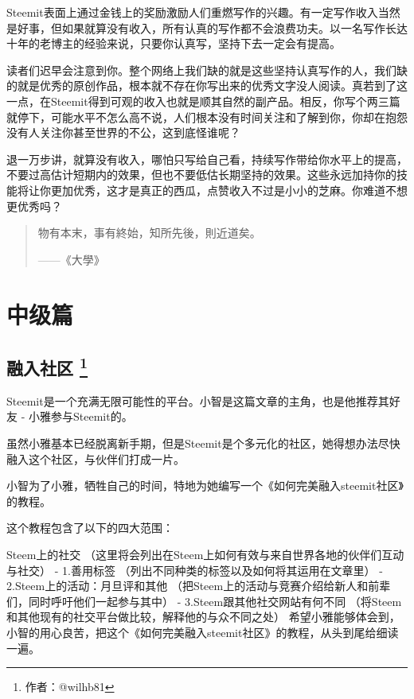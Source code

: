 \documentclass[]{ctexbook}
\begin{document}
Steemit表面上通过金钱上的奖励激励人们重燃写作的兴趣。有一定写作收入当然是好事，但如果就算没有收入，所有认真的写作都不会浪费功夫。以一名写作长达十年的老博主的经验来说，只要你认真写，坚持下去一定会有提高。

读者们迟早会注意到你。整个网络上我们缺的就是这些坚持认真写作的人，我们缺的就是优秀的原创作品，根本就不存在你写出来的优秀文字没人阅读。真若到了这一点，在Steemit得到可观的收入也就是顺其自然的副产品。相反，你写个两三篇就停下，可能水平不怎么高不说，人们根本没有时间关注和了解到你，你却在抱怨没有人关注你甚至世界的不公，这到底怪谁呢？

退一万步讲，就算没有收入，哪怕只写给自己看，持续写作带给你水平上的提高，不要过高估计短期内的效果，但也不要低估长期坚持的效果。这些永远加持你的技能将让你更加优秀，这才是真正的西瓜，点赞收入不过是小小的芝麻。你难道不想更优秀吗？

\begin{quote}
物有本末，事有終始，知所先後，則近道矣。

\begin{flushright}------《大學》\end{flushright}
\end{quote}

\hypertarget{zjp}{%
\part{中级篇}\label{zjp}}

\chapter[融入社区 ]{\texorpdfstring{融入社区 \footnote{作者：@wilhb81}}{融入社区 }}

Steemit是一个充满无限可能性的平台。小智是这篇文章的主角，也是他推荐其好友 - 小雅参与Steemit的。

虽然小雅基本已经脱离新手期，但是Steemit是个多元化的社区，她得想办法尽快融入这个社区，与伙伴们打成一片。

小智为了小雅，牺牲自己的时间，特地为她编写一个《如何完美融入steemit社区》的教程。

这个教程包含了以下的四大范围：

Steem上的社交 （这里将会列出在Steem上如何有效与来自世界各地的伙伴们互动与社交）
- 1.善用标签 （列出不同种类的标签以及如何将其运用在文章里）
- 2.Steem上的活动：月旦评和其他 （把Steem上的活动与竞赛介绍给新人和前辈们，同时呼吁他们一起参与其中）
- 3.Steem跟其他社交网站有何不同 （将Steem和其他现有的社交平台做比较，解释他的与众不同之处）
希望小雅能够体会到，小智的用心良苦，把这个《如何完美融入steemit社区》的教程，从头到尾给细读一遍。
\end{document}
